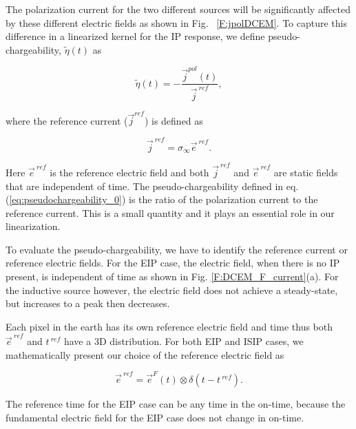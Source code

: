 \documentclass[letterpaper,11pt]{article}
\newcommand{\siginf}{\sigma_\infty}
\renewcommand {\j}  { {\vec j} }
\newcommand {\e}  { {\vec e} }
\newcommand{\peta}{\tilde{\eta}}
\newcommand{\eref}{\e^{\ ref}}
\begin{document}
The polarization current for the two different sources will be significantly affected by these different electric fields as shown in Fig. ~\ref{F:jpolDCEM}. 
To capture this difference in a linearized kernel for the IP response, we define pseudo-chargeability, $\peta(t)$ as 
\begin{linenomath*}
\begin{equation}
  \peta(t) = -\frac{\j^{pol}(t)}{\j^{\ ref}},
  \label{eq:pseudochargeability_0}
\end{equation}
\end{linenomath*}
where the reference current ($\j^{ref}$) is defined as 
\begin{linenomath*}
\begin{equation}
  \j^{\ ref} = \siginf \eref.
  \label{eq:reference_current}
\end{equation}
\end{linenomath*}
Here $\eref$ is the reference electric field and both $\j^{\ ref}$ and $\eref$ are static fields that are independent of time. 
The pseudo-chargeability defined in eq. (\ref{eq:pseudochargeability_0})  is the ratio of  the polarization current to the reference current. This is a small quantity and it plays an essential role in our linearization. 

To evaluate the pseudo-chargeability, we have to identify the reference current or reference electric fields. For the EIP case, the electric field, when there is no IP present, is independent of time as shown in Fig. \ref{F:DCEM_F_current}(a). For the inductive source however, the electric field does not achieve a steady-state, but increases to a  peak then decreases. 

Each pixel in the earth has its own reference electric field and time thus  both $\eref$ and $t^{\ ref}$ have a 3D distribution. 
For both EIP and ISIP cases, we mathematically present our choice of the reference electric field as
\begin{linenomath*}
\begin{equation}
  \eref = \e^{F}(t) \otimes \delta(t-t^{\ ref}). 
  \label{eq:reference_electricfield}
\end{equation}
\end{linenomath*}
The reference time for the EIP case can be any time in the on-time, because the fundamental electric field for the EIP case does not change in on-time. 
\end{document}

